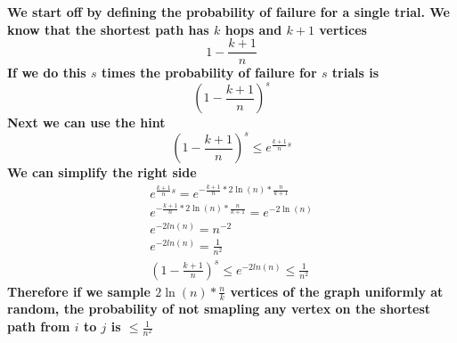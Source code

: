 \documentclass[addpoints]{exam}
\def\mysolution#1{}    %
\begin{document}
\begin{questions}
\begin{parts}
\textbf{We start off by defining the probability of failure for a single trial. We know that the shortest path has $k$ hops and $k+1$ vertices}
\[
1-\frac{k+1}{n}
\]
\textbf{If we do this $s$ times the probability of failure for $s$ trials is}
\[
(1-\frac{k+1}{n})^s
\]
\textbf{Next we can use the hint}
\[
(1-\frac{k+1}{n})^s \le e^{\frac{k+1}{n}s}
\]
\textbf{We can simplify the right side}
\setcounter{equation}{0}
\begin{align}
e^{\frac{k+1}{n}s} = e^{-\frac{k+1}{n} * 2\ln(n) * \frac{n}{k+1}} \\
e^{-\frac{k+1}{n} * 2\ln(n) * \frac{n}{k+1}} = e^{-2\ln(n)} \\ 
e^{-2ln(n)} = n^{-2} \\
e^{-2ln(n)} = \frac{1}{n^2} \\
(1-\frac{k+1}{n})^s \le e^{-2ln(n)} \le \frac{1}{n^2}
\end{align}
\textbf{Therefore if we sample $2\ln(n) * \frac{n}{k}$ vertices of the graph uniformly at random, the probability of not smapling any vertex on the shortest path from $i$ to $j$ is $\le \frac{1}{n^2}$}

\mysolution{

}
\end{parts}
\end{questions}
\end{document}
